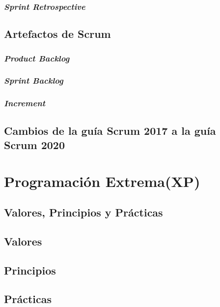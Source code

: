 \begin{spacing}{1.5}
		\subsubsection{\textit{Sprint Retrospective}}
					\lipsum[1]
	\subsection{Artefactos de Scrum}
				\lipsum[1]
		\subsubsection{\textit{Product Backlog}}
					\lipsum[1]
		\subsubsection{\textit{Sprint Backlog}}
					\lipsum[1]
		\subsubsection{\textit{Increment}}
					\lipsum[1]
	\subsection{Cambios de la gu\'{i}a Scrum 2017 a la gu\'{i}a Scrum 2020}
				\lipsum[1]
\section{Programaci\'{o}n Extrema(XP)}
		\lipsum[1-2]
	\subsection{Valores, Principios y Pr\'{a}cticas}
			\lipsum[1]
	\subsection{Valores}
				\lipsum[1]
	\subsection{Principios}
				\lipsum[1]
	\subsection{Pr\'{a}cticas}
				\lipsum[1]

\end{spacing}
